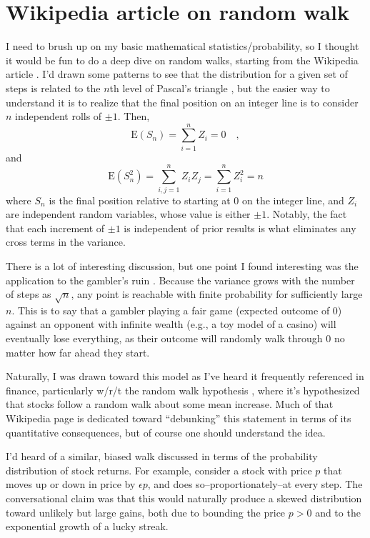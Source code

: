\documentclass{article}
\begin{document}
\section{Wikipedia article on random walk}

I need to brush up on my basic mathematical statistics/probability, so I thought it would be fun to do a deep dive on random walks, starting from the Wikipedia article \cite{RandomWalk2026}.  I'd drawn some patterns to see that the distribution for a given set of steps is related to the $n$th level of Pascal's triangle \cite{PaslcalsTriangle2026}, but the easier way to understand it is to realize that the final position on an integer line is to consider $n$ independent rolls of $\pm1$.  Then,
\begin{equation}
    \text{E}(S_n) = \sum_{i=1}^n Z_i = 0\quad ,
\end{equation}
and 
\begin{equation}
    \text{E}(S_n^2) = \sum_{i,j = 1}^n Z_i Z_j = \sum_{i=1}^n Z_i^2 = n
\end{equation}
where $S_n$ is the final position relative to starting at 0 on the integer line, and $Z_i$ are independent random variables, whose value is either $\pm1$.  Notably, the fact that each increment of $\pm1$ is independent of prior results is what eliminates any cross terms in the variance.

There is a lot of interesting discussion, but one point I found interesting was the application to the gambler's ruin \cite{GamblersRuin2026}.  Because the variance grows with the number of steps as $\sqrt{n}$, any point is reachable with finite probability for sufficiently large $n$.  This is to say that a gambler playing a fair game (expected outcome of 0) against an opponent with infinite wealth (e.g., a toy model of a casino) will eventually lose everything, as their outcome will randomly walk through 0 no matter how far ahead they start.

Naturally, I was drawn toward this model as I've heard it frequently referenced in finance, particularly w/r/t the random walk hypothesis \cite{RandomWalkHypothesis2026}, where it's hypothesized that stocks follow a random walk about some mean increase.  Much of that Wikipedia page is dedicated toward ``debunking'' this statement in terms of its quantitative consequences, but of course one should understand the idea.

I'd heard of a similar, biased walk discussed in terms of the probability distribution of stock returns.  For example, consider a stock with price $p$ that moves up or down in price by $\epsilon p$, and does so--proportionately--at every step.  The conversational claim was that this would naturally produce a skewed distribution toward unlikely but large gains, both due to bounding the price $p>0$ and to the exponential growth of a lucky streak.
\end{document}
